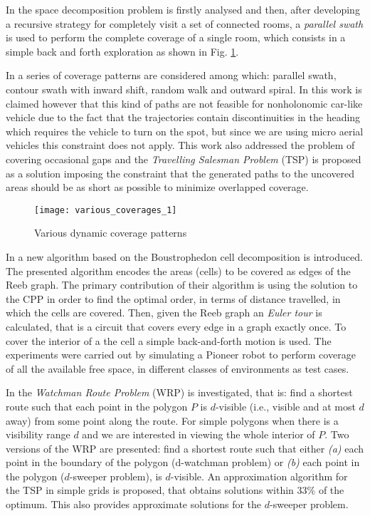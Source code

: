 In \cite{ChongCoverage} the space decomposition problem is firstly analysed and then, after developing a recursive strategy for completely visit a set of connected rooms, a \emph{parallel swath} is used to perform the complete coverage of a single room, which consists in a simple back and forth exploration as shown in Fig. \ref{fig:covTypes}.

In \cite{navidCovAlgs} a series of coverage patterns are considered among which: parallel swath, contour swath with inward shift, random walk and outward spiral. In this work is claimed however that this kind of paths are not feasible for nonholonomic car-like vehicle due to the fact that the trajectories contain
discontinuities in the heading which requires the vehicle to turn on the spot, but since we are using micro aerial vehicles this constraint does not apply. This work also addressed the problem of covering occasional gaps and the \emph{Travelling Salesman Problem} (TSP) is proposed as a solution imposing the constraint that the generated paths to the uncovered areas should be as short as possible to minimize overlapped coverage.

\begin{figure}[ht]
\centering
\texttt{[image: various\_coverages\_1]}
\caption{Various dynamic coverage patterns}
\label{fig:covTypes}
\end{figure}

In \cite{MannadiarR10} a new algorithm based on the Boustrophedon cell decomposition is introduced. The presented algorithm encodes the areas (cells) to be covered as edges of the Reeb graph. The primary contribution of their algorithm is using the solution to the CPP in order to find the optimal order, in terms of distance travelled, in which the cells are covered. Then, given the Reeb graph an \emph{Euler tour} is calculated, that is a circuit that covers every edge in a graph exactly once. To cover the interior of a the cell a simple back-and-forth motion is used. The experiments were carried out by simulating a Pioneer robot to perform coverage of all the available free space, in different classes of environments as test cases.

In \cite{Naftos:1992} the \emph{Watchman Route Problem} (WRP) is investigated, that is: find a shortest route such that each point in the polygon $P$ is $d$-visible (i.e., visible and at most $d$ away) from some point along the route. For simple polygons when there is a visibility range $d$ and we are interested in viewing the whole interior of $P$. Two versions of the WRP are presented: find a shortest route such that either \emph{(a)} each point in the boundary of the polygon (d-watchman problem) or \emph{(b)} each point in the polygon ($d$-sweeper problem), is $d$-visible. An approximation algorithm for the TSP in simple grids is proposed, that obtains solutions within 33\% of the optimum. This also provides approximate solutions for the $d$-sweeper problem.

